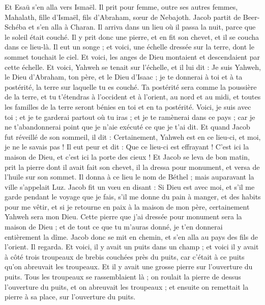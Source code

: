 \begin{multicols}{2}
Et Esaü s'en alla vers Ismaël. Il prit pour femme, outre ses autres femmes, Mahalath, fille d'Ismaël, fils d'Abraham, sœur de Nebajoth.
Jacob partit de Beer-Schéba et s'en alla à Charan.
Il arriva dans un lieu où il passa la nuit, parce que le soleil était couché. Il y prit donc une pierre, et en fit son chevet, et il se coucha dans ce lieu-là.
Il eut un songe ; et voici, une échelle dressée sur la terre, dont le sommet touchait le ciel. Et voici, les anges de Dieu montaient et descendaient par cette échelle.
Et voici, Yahweh se tenait sur l'échelle, et il lui dit : Je suis Yahweh, le Dieu d'Abraham, ton père, et le Dieu d'Isaac ; je te donnerai à toi et à ta postérité, la terre sur laquelle tu es couché.
Ta postérité sera comme la poussière de la terre, et tu t'étendras à l'occident et à l'orient, au nord et au midi, et toutes les familles de la terre seront bénies en toi et en ta postérité.
Voici, je suis avec toi ; et je te garderai partout où tu iras ; et je te ramènerai dans ce pays ; car je ne t'abandonnerai point que je n'aie exécuté ce que je t'ai dit.
Et quand Jacob fut réveillé de son sommeil, il dit : Certainement, Yahweh est en ce lieu-ci, et moi, je ne le savais pas !
Il eut peur et dit : Que ce lieu-ci est effrayant ! C'est ici la maison de Dieu, et c'est ici la porte des cieux !
Et Jacob se leva de bon matin, prit la pierre dont il avait fait son chevet, il la dressa pour monument, et versa de l'huile sur son sommet.
Il donna à ce lieu le nom de Béthel ; mais auparavant la ville s'appelait Luz.
Jacob fit un vœu en disant : Si Dieu est avec moi, et s'il me garde pendant le voyage que je fais, s'il me donne du pain à manger, et des habits pour me vêtir,
et si je retourne en paix à la maison de mon père, certainement Yahweh sera mon Dieu.
Cette pierre que j'ai dressée pour monument sera la maison de Dieu ; et de tout ce que tu m'auras donné, je t'en donnerai entièrement la dîme.
\VerseOne{}Jacob donc se mit en chemin, et s'en alla au pays des fils de l'orient.
Il regarda. Et voici, il y avait un puits dans un champ ; et voici il y avait à côté trois troupeaux de brebis couchées près du puits, car c'était à ce puits qu'on abreuvait les troupeaux. Et il y avait une grosse pierre sur l'ouverture du puits.
Tous les troupeaux se rassemblaient là ; on roulait la pierre de dessus l'ouverture du puits, et on abreuvait les troupeaux ; et ensuite on remettait la pierre à sa place, sur l'ouverture du puits.

\end{multicols}
